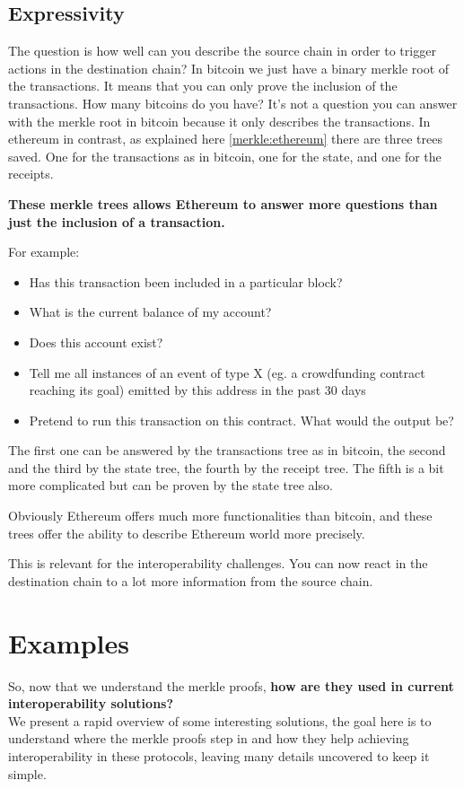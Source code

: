 \subsection{Expressivity}
The question is how well can you describe the source chain in order to trigger actions in the destination chain?
In bitcoin we just have a binary merkle root of the transactions. It means that you can only prove the inclusion of the transactions. 
How many bitcoins do you have? It's not a question you can answer with the merkle root in bitcoin because it only describes the transactions. 
In ethereum in contrast, as explained here \ref{merkle:ethereum} there are three trees saved. One for the transactions as in bitcoin, one for the state, and one for the receipts. 


\textbf{
These merkle trees allows Ethereum to answer more questions than just the inclusion of a transaction.
}

For example:
\begin{itemize}
\item Has this transaction been included in a particular block?
\item What is the current balance of my account?
\item Does this account exist?
\item Tell me all instances of an event of type X (eg. a crowdfunding contract reaching its goal) emitted by this address in the past 30 days
\item Pretend to run this transaction on this contract. What would the output be?
\end{itemize}

The first one can be answered by the transactions tree as in bitcoin, the second and the third by the state tree, the fourth by the receipt tree. The fifth is a bit more complicated but can be proven by the state tree also. 


Obviously Ethereum offers much more functionalities than bitcoin, and these trees offer the ability to describe Ethereum world more precisely. 

This is relevant for the interoperability challenges. You can now react in the destination chain to a lot more information from the source chain. 

\section{Examples}
So, now that we understand the merkle proofs, \textbf{how are they used in current interoperability solutions?}
\\We present a rapid overview of some interesting solutions, the goal here is to understand where the merkle proofs step in and how they help achieving interoperability in these protocols, leaving many details uncovered to keep it simple.


